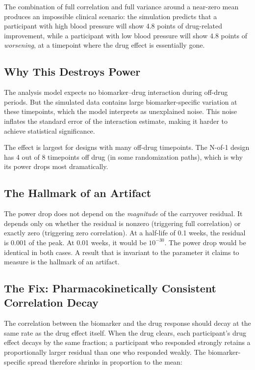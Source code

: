 \documentclass[11pt]{article}
\begin{document}
The combination of full correlation and full variance around a
near-zero mean produces an impossible clinical scenario: the
simulation predicts that a participant with high blood pressure
will show 4.8 points of drug-related improvement, while a
participant with low blood pressure will show 4.8 points of
\emph{worsening}, at a timepoint where the drug effect is
essentially gone.

\subsection{Why This Destroys Power}

The analysis model expects no biomarker--drug interaction
during off-drug periods. But the simulated data contains large
biomarker-specific variation at these timepoints, which the
model interprets as unexplained noise. This noise inflates the
standard error of the interaction estimate, making it harder
to achieve statistical significance.

The effect is largest for designs with many off-drug
timepoints. The N-of-1 design has 4 out of 8 timepoints off
drug (in some randomization paths), which is why its power
drops most dramatically.

\subsection{The Hallmark of an Artifact}

The power drop does not depend on the \emph{magnitude} of the
carryover residual. It depends only on whether the residual is
nonzero (triggering full correlation) or exactly zero
(triggering zero correlation). At a half-life of 0.1 weeks,
the residual is 0.001 of the peak. At 0.01 weeks, it would be
$10^{-30}$. The power drop would be identical in both cases.
A result that is invariant to the parameter it claims to
measure is the hallmark of an artifact.

\subsection{The Fix: Pharmacokinetically Consistent Correlation
            Decay}

The correlation between the biomarker and the drug response
should decay at the same rate as the drug effect itself. When
the drug clears, each participant's drug effect decays by the
same fraction; a participant who responded strongly retains
a proportionally larger residual than one who responded weakly.
The biomarker-specific spread therefore shrinks in proportion
to the mean:
\end{document}
